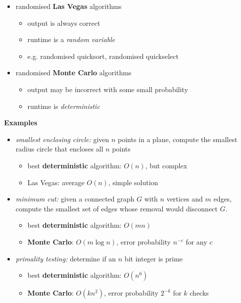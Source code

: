 \documentclass[10pt, landscape]{article}
\begin{document}
\begin{multicols*}{4}
  \begin{itemize}
    \item randomised \textbf{Las Vegas} algorithms
      \begin{itemize}
        \item output is always correct
        \item runtime is a \textit{random variable} 
        \item e.g. randomised quicksort, randomised quickselect
      \end{itemize}
    \item randomised \textbf{Monte Carlo} algorithms
      \begin{itemize}
        \item output may be incorrect with some small probability
        \item runtime is \textit{deterministic}
      \end{itemize}
  \end{itemize}

  \textbf{Examples}
  \begin{itemize}
    \item \textit{smallest enclosing circle:} given $n$ points in a plane, compute the smallest radius circle that encloses all $n$ points
      \begin{itemize}
        \item best \textbf{deterministic} algorithm: $O(n)$, but complex
        \item Las Vegas: average $O(n) $, simple solution
      \end{itemize}
    \item \textit{minimum cut:} given a connected graph $G$ with $n$ vertices and $m$ edges, compute the smallest set of edges whose removal would disconnect $G$.
      \begin{itemize}
        \item best \textbf{deterministic} algorithm: $O(mn)$
        \item \textbf{Monte Carlo}: $O(m \log n) $, error probability $n^{-c}$ for any $c$
      \end{itemize}
    \item \textit{primality testing:} determine if an $n$ bit integer is prime
      \begin{itemize}
        \item best \textbf{deterministic} algorithm: $O(n^6)$
        \item \textbf{Monte Carlo}: $O(kn^2)$, error probability $2^{-k}$ for $k$ checks
      \end{itemize}
  \end{itemize}


\end{multicols*}
\end{document}
